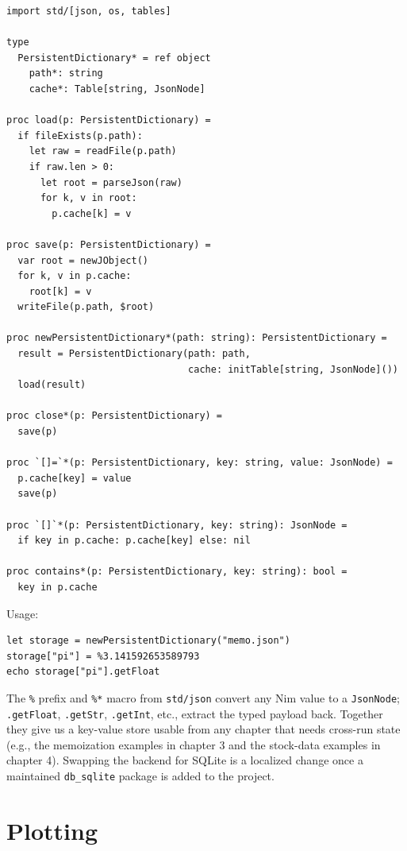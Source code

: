 \documentclass[justified, sixbynine]{tufte-book}
\def\ft{\small\tt}
\theoremstyle{plain}%
\newtheorem * {corollary}{Corollary}
\theoremstyle{definition}
\theoremstyle{remark}
\newtheorem * {remark}{Remark}
\newtheorem * {note}{Note}
\begin{document}
\begin{fullwidth}
\begin{lstlisting}[caption={in file: {\ft nlib/persistent.nim}}]
import std/[json, os, tables]

type
  PersistentDictionary* = ref object
    path*: string
    cache*: Table[string, JsonNode]

proc load(p: PersistentDictionary) =
  if fileExists(p.path):
    let raw = readFile(p.path)
    if raw.len > 0:
      let root = parseJson(raw)
      for k, v in root:
        p.cache[k] = v

proc save(p: PersistentDictionary) =
  var root = newJObject()
  for k, v in p.cache:
    root[k] = v
  writeFile(p.path, $root)

proc newPersistentDictionary*(path: string): PersistentDictionary =
  result = PersistentDictionary(path: path,
                                cache: initTable[string, JsonNode]())
  load(result)

proc close*(p: PersistentDictionary) =
  save(p)

proc `[]=`*(p: PersistentDictionary, key: string, value: JsonNode) =
  p.cache[key] = value
  save(p)

proc `[]`*(p: PersistentDictionary, key: string): JsonNode =
  if key in p.cache: p.cache[key] else: nil

proc contains*(p: PersistentDictionary, key: string): bool =
  key in p.cache
\end{lstlisting}

Usage:

\begin{lstlisting}
let storage = newPersistentDictionary("memo.json")
storage["pi"] = %3.141592653589793
echo storage["pi"].getFloat
\end{lstlisting}

The {\ft \%} prefix and {\ft \%*} macro from {\ft std/json} convert any Nim value to a {\ft JsonNode}; {\ft .getFloat}, {\ft .getStr}, {\ft .getInt}, etc., extract the typed payload back. Together they give us a key-value store usable from any chapter that needs cross-run state (e.g., the memoization examples in chapter 3 and the stock-data examples in chapter 4). Swapping the backend for SQLite is a localized change once a maintained {\ft db\_sqlite} package is added to the project.

\goodbreak\section{Plotting}


\end{fullwidth}
\end{document}
